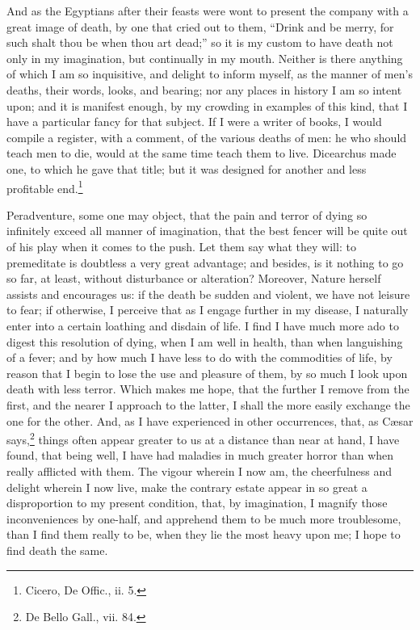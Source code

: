 \noindent And as the Egyptians after their feasts were wont to present
the company with a great image of death, by one that cried out to
them, ``Drink and be merry, for such shalt thou be when thou art
dead;'' so it is my custom to have death not only in my imagination,
but continually in my mouth. Neither is there anything of which I am
so inquisitive, and delight to inform myself, as the manner of men's
deaths, their words, looks, and bearing; nor any places in history I
am so intent upon; and it is manifest enough, by my crowding in
examples of this kind, that I have a particular fancy for that
subject. If I were a writer of books, I would compile a register, with
a comment, of the various deaths of men: he who should teach men to
die, would at the same time teach them to live. Dicearchus made one,
to which he gave that title; but it was designed for another and less
profitable end.\footnote{Cicero, De Offic., ii. 5.}

Peradventure, some one may object, that the pain and terror
of dying so infinitely exceed all manner of imagination, that the best
fencer will be quite out of his play when it comes to the push. Let
them say what they will: to premeditate is doubtless a very great
advantage; and besides, is it nothing to go so far, at least, without
disturbance or alteration? Moreover, Nature herself assists and
encourages us: if the death be sudden and violent, we have not leisure
to fear; if otherwise, I perceive that as I engage further in my
disease, I naturally enter into a certain loathing and disdain of
life. I find I have much more ado to digest this resolution of dying,
when I am well in health, than when languishing of a fever; and by how
much I have less to do with the commodities of life, by reason that I
begin to lose the use and pleasure of them, by so much I look upon
death with less terror. Which makes me hope, that the further I remove
from the first, and the nearer I approach to the latter, I shall the
more easily exchange the one for the other. And, as I have experienced
in other occurrences, that, as C\ae sar says,\footnote{De Bello Gall.,
vii. 84.} things often appear greater to us at a distance than near at
hand, I have found, that being well, I have had maladies in much
greater horror than when really afflicted with them. The vigour
wherein I now am, the cheerfulness and delight wherein I now live,
make the contrary estate appear in so great a disproportion to my
present condition, that, by imagination, I magnify those
inconveniences by one-half, and apprehend them to be much more
troublesome, than I find them really to be, when they lie the most
heavy upon me; I hope to find death the same.

